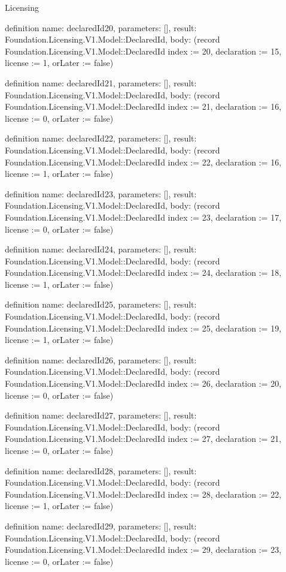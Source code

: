 \begin{lexlean}{Licensing}
\begin{semanticmodule}
definition{
  name: declaredId20,
  parameters: [],
  result: Foundation.Licensing.V1.Model::DeclaredId,
  body: (record Foundation.Licensing.V1.Model::DeclaredId {index := 20, declaration := 15, license := 1, orLater := false})
}

definition{
  name: declaredId21,
  parameters: [],
  result: Foundation.Licensing.V1.Model::DeclaredId,
  body: (record Foundation.Licensing.V1.Model::DeclaredId {index := 21, declaration := 16, license := 0, orLater := false})
}

definition{
  name: declaredId22,
  parameters: [],
  result: Foundation.Licensing.V1.Model::DeclaredId,
  body: (record Foundation.Licensing.V1.Model::DeclaredId {index := 22, declaration := 16, license := 1, orLater := false})
}

definition{
  name: declaredId23,
  parameters: [],
  result: Foundation.Licensing.V1.Model::DeclaredId,
  body: (record Foundation.Licensing.V1.Model::DeclaredId {index := 23, declaration := 17, license := 0, orLater := false})
}

definition{
  name: declaredId24,
  parameters: [],
  result: Foundation.Licensing.V1.Model::DeclaredId,
  body: (record Foundation.Licensing.V1.Model::DeclaredId {index := 24, declaration := 18, license := 1, orLater := false})
}

definition{
  name: declaredId25,
  parameters: [],
  result: Foundation.Licensing.V1.Model::DeclaredId,
  body: (record Foundation.Licensing.V1.Model::DeclaredId {index := 25, declaration := 19, license := 1, orLater := false})
}

definition{
  name: declaredId26,
  parameters: [],
  result: Foundation.Licensing.V1.Model::DeclaredId,
  body: (record Foundation.Licensing.V1.Model::DeclaredId {index := 26, declaration := 20, license := 0, orLater := false})
}

definition{
  name: declaredId27,
  parameters: [],
  result: Foundation.Licensing.V1.Model::DeclaredId,
  body: (record Foundation.Licensing.V1.Model::DeclaredId {index := 27, declaration := 21, license := 0, orLater := false})
}

definition{
  name: declaredId28,
  parameters: [],
  result: Foundation.Licensing.V1.Model::DeclaredId,
  body: (record Foundation.Licensing.V1.Model::DeclaredId {index := 28, declaration := 22, license := 1, orLater := false})
}

definition{
  name: declaredId29,
  parameters: [],
  result: Foundation.Licensing.V1.Model::DeclaredId,
  body: (record Foundation.Licensing.V1.Model::DeclaredId {index := 29, declaration := 23, license := 0, orLater := false})
}


\end{semanticmodule}
\end{lexlean}
